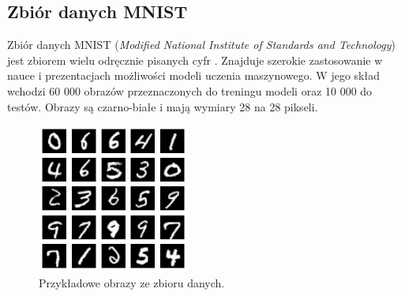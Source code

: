 \documentclass[a4paper,12pt,oneside]{book} %
\begin{document}
\subsection{Zbiór danych MNIST}
Zbiór danych MNIST (\textit{Modified National Institute of Standards and Technology}) jest zbiorem wielu odręcznie pisanych cyfr \cite{mnist}. Znajduje szerokie zastosowanie w nauce i prezentacjach możliwości modeli uczenia maszynowego. W jego skład wchodzi 60 000 obrazów przeznaczonych do treningu modeli oraz 10 000 do testów. Obrazy są czarno-białe i mają wymiary 28 na 28 pikseli.
\begin{figure}[h]
	\centering\includegraphics[width=5cm]{pictures/mnist.png}
	\caption{Przykładowe obrazy ze zbioru danych.}
\end{figure}
\newpage
\end{document}
